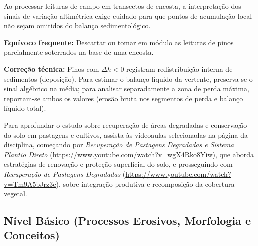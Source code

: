 
Ao processar leituras de campo em transectos de encosta, a interpretação dos sinais de variação altimétrica exige cuidado para que pontos de acumulação local não sejam omitidos do balanço sedimentológico.

\begin{boxErro}
\textbf{Equívoco frequente:} Descartar ou tomar em módulo as leituras de pinos parcialmente soterrados na base de uma encosta.\par
\textbf{Correção técnica:} Pinos com $\Delta h < 0$ registram redistribuição interna de sedimentos (deposição). Para estimar o balanço líquido da vertente, preserva-se o sinal algébrico na média; para analisar separadamente a zona de perda máxima, reportam-se ambos os valores (erosão bruta nos segmentos de perda e balanço líquido total).
\end{boxErro}

Para aprofundar o estudo sobre recuperação de áreas degradadas e conservação do solo em pastagens e cultivos, assista às videoaulas selecionadas na página da disciplina, começando por \textit{Recuperação de Pastagens Degradadas e Sistema Plantio Direto} (\url{https://www.youtube.com/watch?v=wgX4Rko8Yiw}), que aborda estratégias de renovação e proteção superficial do solo, e prosseguindo com \textit{Recuperação de Pastagens Degradadas} (\url{https://www.youtube.com/watch?v=Tm9A5bJrz3c}), sobre integração produtiva e recomposição da cobertura vegetal.


\subsection*{Nível Básico (Processos Erosivos, Morfologia e Conceitos)}

